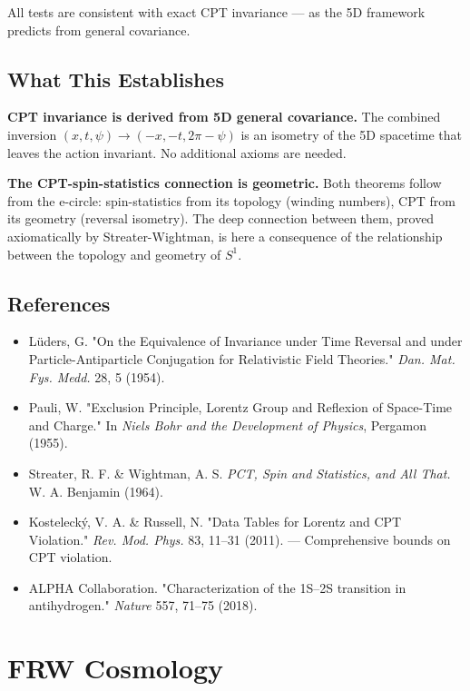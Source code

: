 \documentclass[aps,prd,preprint,superscriptaddress,longbibliography,floatfix]{revtex4-2}
\theoremstyle{remark}
\begin{document}
All tests are consistent with exact CPT invariance --- as the 5D framework predicts from general covariance.



\subsection{What This Establishes}

\textbf{CPT invariance is derived from 5D general covariance.} The combined inversion $(x, t, \psi) \to (-x, -t, 2\pi - \psi)$ is an isometry of the 5D spacetime that leaves the action invariant. No additional axioms are needed.

\textbf{The CPT-spin-statistics connection is geometric.} Both theorems follow from the e-circle: spin-statistics from its topology (winding numbers), CPT from its geometry (reversal isometry). The deep connection between them, proved axiomatically by Streater-Wightman, is here a consequence of the relationship between the topology and geometry of $S^{1}$.



\subsection{References}


\begin{itemize}
  \item L\"{u}ders, G. "On the Equivalence of Invariance under Time Reversal and under Particle-Antiparticle Conjugation for Relativistic Field Theories." \textit{Dan. Mat. Fys. Medd.} 28, 5 (1954).
  \item Pauli, W. "Exclusion Principle, Lorentz Group and Reflexion of Space-Time and Charge." In \textit{Niels Bohr and the Development of Physics}, Pergamon (1955).
  \item Streater, R. F. \& Wightman, A. S. \textit{PCT, Spin and Statistics, and All That.} W. A. Benjamin (1964).
  \item Kostelecký, V. A. \& Russell, N. "Data Tables for Lorentz and CPT Violation." \textit{Rev. Mod. Phys.} 83, 11--31 (2011). --- Comprehensive bounds on CPT violation.
  \item ALPHA Collaboration. "Characterization of the 1S--2S transition in antihydrogen." \textit{Nature} 557, 71--75 (2018).
\end{itemize}


\section{FRW Cosmology}
\end{document}
